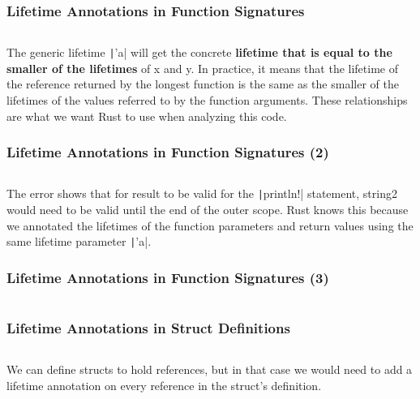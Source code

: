 \documentclass{beamer}
\begin{document}
\begin{frame}[fragile]
	\frametitle{Lifetime Annotations in Function Signatures}
	\inputminted{rust}{./code/lifetime4.rs}
	
	The generic lifetime \texttt|'a| will get the concrete \textbf{lifetime that is equal to the smaller of the lifetimes }of x and y. In practice, it means that the lifetime of the reference returned by the longest function is the same as the smaller of the lifetimes of the values referred to by the function arguments. These relationships are what we want Rust to use when analyzing this code.
\end{frame}


\begin{frame}[fragile]
	\frametitle{Lifetime Annotations in Function Signatures (2)}
	\inputminted{rust}{./code/lifetime5.rs}
	
	The error shows that for result to be valid for the \texttt|println!| statement, string2 would need to be valid until the end of the outer scope. Rust knows this because we annotated the lifetimes of the function parameters and return values using the same lifetime parameter \texttt|'a|.
	
\end{frame}

\begin{frame}[fragile]
	\frametitle{Lifetime Annotations in Function Signatures (3)}
	\inputminted{shell}{./code/lifetime5.shell}
	
\end{frame}

\begin{frame}[fragile]
	\frametitle{Lifetime Annotations in Struct Definitions}
	\inputminted{rust}{./code/lifetime6.rs}
	
	We can define structs to hold references, but in that case we would need to add a lifetime annotation on every reference in the struct’s definition.
	
\end{frame}
\end{document}
